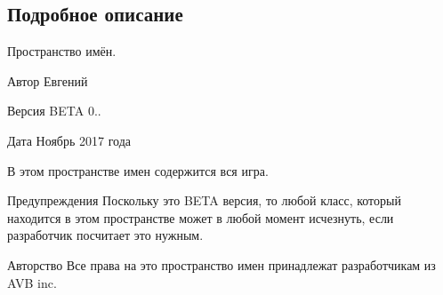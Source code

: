 \subsection{Подробное описание}
Пространство имён. 

\begin{DoxyAuthor}{Автор}
Евгений 
\end{DoxyAuthor}
\begin{DoxyVersion}{Версия}
B\+E\+TA 0.. 
\end{DoxyVersion}
\begin{DoxyDate}{Дата}
Ноябрь 2017 года
\end{DoxyDate}
В этом пространстве имен содержится вся игра. \begin{DoxyWarning}{Предупреждения}
Поскольку это B\+E\+TA версия, то любой класс, который находится в этом пространстве может в любой момент исчезнуть, если разработчик посчитает это нужным. 
\end{DoxyWarning}
\begin{DoxyCopyright}{Авторство}
Все права на это пространство имен принадлежат разработчикам из A\+VB inc. 
\end{DoxyCopyright}
